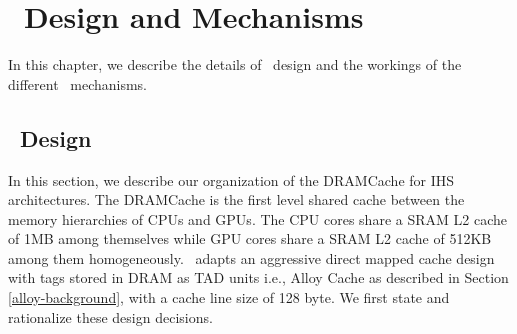 \chapter{\cachename\ Design and Mechanisms} \label{chap:hashcache}
In this chapter, we describe the details of \cachename\ design and the workings of the different \cachename\ mechanisms.
\section{\cachename\ Design} \label{design}
In this section, we describe our organization of the DRAMCache for IHS architectures. The DRAMCache is the first level shared cache between the memory hierarchies of CPUs and GPUs. The CPU cores share a SRAM L2 cache of 1MB among themselves while GPU cores share a SRAM L2 cache of 512KB among them homogeneously. \cachename\ adapts an aggressive direct mapped cache design with tags stored in DRAM as TAD units i.e., Alloy Cache as described in Section \ref{alloy-background}, with a cache line size of 128 byte. We first state and rationalize these design decisions.

